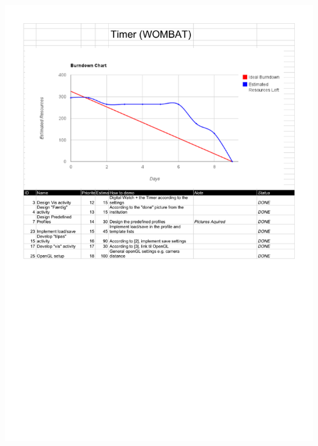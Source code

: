 \begin{center}
		\includegraphics[width=\textwidth]{Development/burndown_charts/Sprint_2.pdf}

\end{center}
